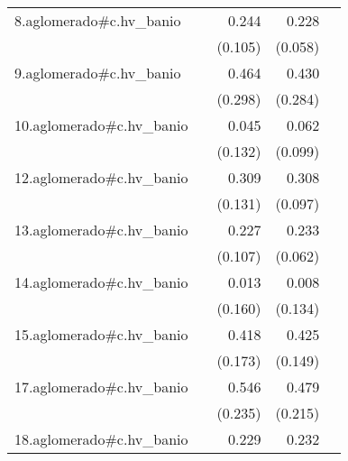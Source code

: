 {\begin{longtable}{l*{4}{D{.}{.}{-1}}}
\addlinespace
8.aglomerado#c.hv\_banio&                     &       0.244\sym{*}  &       0.228\sym{***}&                     \\
            &                     &     (0.105)         &     (0.058)         &                     \\
\addlinespace
9.aglomerado#c.hv\_banio&                     &       0.464         &       0.430         &                     \\
            &                     &     (0.298)         &     (0.284)         &                     \\
\addlinespace
10.aglomerado#c.hv\_banio&                     &       0.045         &       0.062         &                     \\
            &                     &     (0.132)         &     (0.099)         &                     \\
\addlinespace
12.aglomerado#c.hv\_banio&                     &       0.309\sym{*}  &       0.308\sym{**} &                     \\
            &                     &     (0.131)         &     (0.097)         &                     \\
\addlinespace
13.aglomerado#c.hv\_banio&                     &       0.227\sym{*}  &       0.233\sym{***}&                     \\
            &                     &     (0.107)         &     (0.062)         &                     \\
\addlinespace
14.aglomerado#c.hv\_banio&                     &       0.013         &       0.008         &                     \\
            &                     &     (0.160)         &     (0.134)         &                     \\
\addlinespace
15.aglomerado#c.hv\_banio&                     &       0.418\sym{*}  &       0.425\sym{**} &                     \\
            &                     &     (0.173)         &     (0.149)         &                     \\
\addlinespace
17.aglomerado#c.hv\_banio&                     &       0.546\sym{*}  &       0.479\sym{*}  &                     \\
            &                     &     (0.235)         &     (0.215)         &                     \\
\addlinespace
18.aglomerado#c.hv\_banio&                     &       0.229\sym{*}  &       0.232\sym{***}&                     \\

\end{longtable}}
